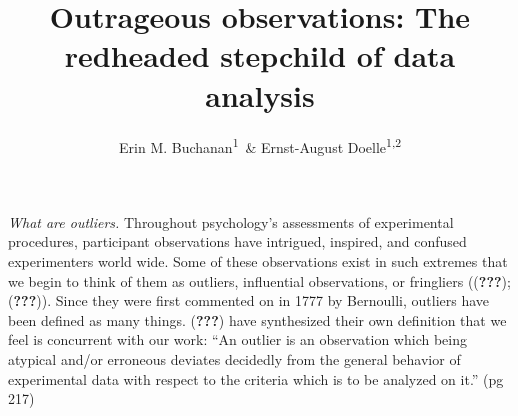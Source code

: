 \documentclass[english,man]{apa6}
\title{Outrageous observations: The redheaded stepchild of data analysis}
\author{Erin M. Buchanan\textsuperscript{1}~\& Ernst-August Doelle\textsuperscript{1,2}}
\affiliation{
    \vspace{0.5cm}
          \textsuperscript{1} Wilhelm-Wundt-University\\
          \textsuperscript{2} Konstanz Business School  }
\theoremstyle{definition}
\theoremstyle{definition}
\theoremstyle{definition}
\theoremstyle{remark}
\begin{document}
\maketitle

\setcounter{secnumdepth}{0}



\emph{What are outliers.} Throughout psychology's assessments of
experimental procedures, participant observations have intrigued,
inspired, and confused experimenters world wide. Some of these
observations exist in such extremes that we begin to think of them as
outliers, influential observations, or fringliers (({\textbf{???}});
({\textbf{???}})). Since they were first commented on in 1777 by
Bernoulli, outliers have been defined as many things. ({\textbf{???}})
have synthesized their own definition that we feel is concurrent with
our work: \enquote{An outlier is an observation which being atypical
and/or erroneous deviates decidedly from the general behavior of
experimental data with respect to the criteria which is to be analyzed
on it.} (pg 217)
\end{document}
